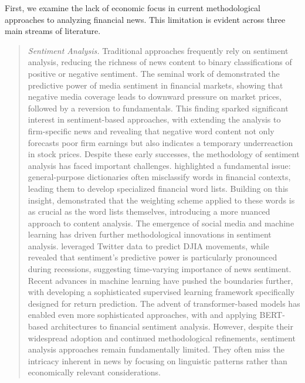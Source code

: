 \mx 
First, we examine the lack of economic focus in current methodological approaches to analyzing financial news. This limitation is evident across three main streams of literature.
\begin{quote}
\hspace{0.5cm} \textit{Sentiment Analysis.} 
Traditional approaches frequently rely on sentiment analysis, reducing the richness of news content to binary classifications of positive or negative sentiment. The seminal work of 
\cite{tetlock2007giving} %
demonstrated the predictive power of media sentiment in financial markets, showing that negative media coverage leads to downward pressure on market prices, followed by a reversion to fundamentals. This finding sparked significant interest in sentiment-based approaches, with 
\cite{tetlock2008more} %
extending the analysis to firm-specific news and revealing that negative word content not only forecasts poor firm earnings but also indicates a temporary underreaction in stock prices.
Despite these early successes, the methodology of sentiment analysis has faced important challenges. 
%
\cite{loughran2011liability} %
highlighted a fundamental issue: general-purpose dictionaries often misclassify words in financial contexts, leading them to develop specialized financial word lists. Building on this insight, 
\cite{jegadeesh2013word} %
demonstrated that the weighting scheme applied to these words is as crucial as the word lists themselves, introducing a more nuanced approach to content analysis.
The emergence of social media and machine learning has driven further methodological innovations in sentiment analysis. 
\cite{bollen2011twitter} %
leveraged Twitter data to predict DJIA movements, while 
\cite{garcia2013sentiment} %
revealed that sentiment's predictive power is particularly pronounced during recessions, suggesting time-varying importance of news sentiment. Recent advances in machine learning have pushed the boundaries further, with 
\cite{ke2019predicting} %
developing a sophisticated supervised learning framework specifically designed for return prediction. The advent of transformer-based models has enabled even more sophisticated approaches, with 
\cite{lee2020bert} %
and 
\cite{wei2018stock} %
applying BERT-based architectures to financial sentiment analysis.
%
However, despite their widespread adoption and continued methodological refinements, sentiment analysis approaches remain fundamentally limited. They often miss the intricacy inherent in news by focusing on linguistic patterns rather than economically relevant considerations. 


\end{quote}
